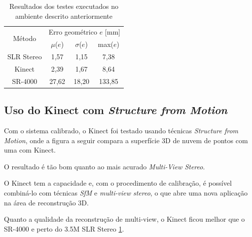 \begin{table}[htbp]
\caption{Resultados dos testes executados no ambiente descrito anteriormente}
\label{tab:resultadosKinect}
\begin{center}
\begin{tabular}{|c|c|c|c|}
\hline
\multirow{2}{1.5cm}{Método}& \multicolumn{3}{p{5cm}|}{Erro geométrico $e$ [mm]} \bigstrut \\
\cline{2-4} & \multicolumn{1}{c|}{$\mu$($e$)} & \multicolumn{1}{c|}{$\sigma$($e$)} & \multicolumn{1}{c|}{max($e$)} \bigstrut \\ \hline
SLR Stereo & 1,57 & 1,15 & 7,38 \bigstrut \\ \hline
Kinect & 2,39 & 1,67 & 8,64 \bigstrut \\ \hline
SR-4000 & 27,62 & 18,20 & 133,85 \bigstrut \\ 
\hline
\end{tabular}
\end{center}
\end{table}

\subsection*{Uso do Kinect com \emph{Structure from Motion}}

Com o sistema calibrado, o Kinect foi testado usando técnicas \emph{Structure from Motion}, onde a figura a seguir compara a superfície 3D de nuvem de pontos com uma com Kinect. 

O resultado é tão bom quanto ao mais acurado \emph{Multi-View Stereo}.

O Kinect tem a capacidade e, com o procedimento de calibração, é possível combiná-lo com técnicas \emph{SfM} e \emph{multi-view stereo}, o que abre uma nova aplicação na área de reconstrução 3D.

Quanto a qualidade da reconstrução de multi-view, o Kinect ficou melhor que o SR-4000 e perto do 3.5M SLR Stereo \ref{tab:resultadosKinect}.



